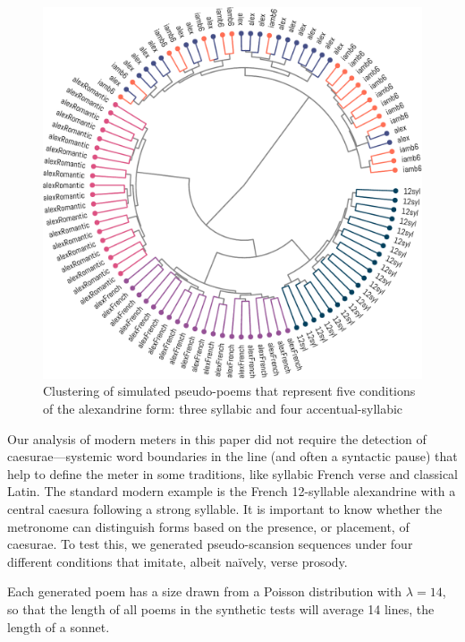 \documentclass[
    hf
]{ceurart}
\begin{document}
\begin{figure}
    \includegraphics[width=\linewidth]{figures/sim_alexandrines-crop.pdf}
    \caption{Clustering of simulated pseudo-poems that represent five conditions of the alexandrine form: three syllabic and four accentual-syllabic}
    \label{fig:sim_alex}
\end{figure}

Our analysis of modern meters in this paper did not require the detection of caesurae---systemic word boundaries in the line (and often a syntactic pause) that help to define the meter in some traditions, like syllabic French verse and classical Latin. The standard modern example is the French 12-syllable alexandrine with a central caesura following a strong syllable. It is important to know whether the metronome can distinguish forms based on the presence, or placement, of caesurae. To test this, we generated pseudo-scansion sequences under four different conditions that imitate, albeit naïvely, verse prosody.

Each generated poem has a size drawn from a Poisson distribution with $\lambda=14$, so that the length of all poems in the synthetic tests will average 14 lines, the length of a sonnet.
\end{document}
